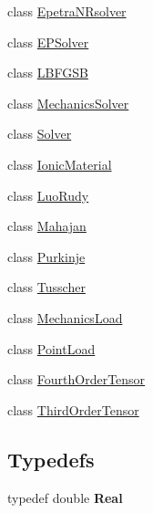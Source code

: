 \begin{DoxyCompactItemize}
\item 
class \hyperlink{classvoom_1_1_epetra_n_rsolver}{EpetraNRsolver}
\item 
class \hyperlink{classvoom_1_1_e_p_solver}{EPSolver}
\item 
class \hyperlink{classvoom_1_1_l_b_f_g_s_b}{LBFGSB}
\item 
class \hyperlink{classvoom_1_1_mechanics_solver}{MechanicsSolver}
\item 
class \hyperlink{classvoom_1_1_solver}{Solver}
\item 
class \hyperlink{classvoom_1_1_ionic_material}{IonicMaterial}
\item 
class \hyperlink{classvoom_1_1_luo_rudy}{LuoRudy}
\item 
class \hyperlink{classvoom_1_1_mahajan}{Mahajan}
\item 
class \hyperlink{classvoom_1_1_purkinje}{Purkinje}
\item 
class \hyperlink{classvoom_1_1_tusscher}{Tusscher}
\item 
class \hyperlink{classvoom_1_1_mechanics_load}{MechanicsLoad}
\item 
class \hyperlink{classvoom_1_1_point_load}{PointLoad}
\item 
class \hyperlink{classvoom_1_1_fourth_order_tensor}{FourthOrderTensor}
\item 
class \hyperlink{classvoom_1_1_third_order_tensor}{ThirdOrderTensor}
\end{DoxyCompactItemize}
\subsection*{Typedefs}
\begin{DoxyCompactItemize}
\item 
\hypertarget{namespacevoom_aedfa692843b69f9b9dca12ef77388d57}{
typedef double {\bfseries Real}}
\label{namespacevoom_aedfa692843b69f9b9dca12ef77388d57}

\end{DoxyCompactItemize}
